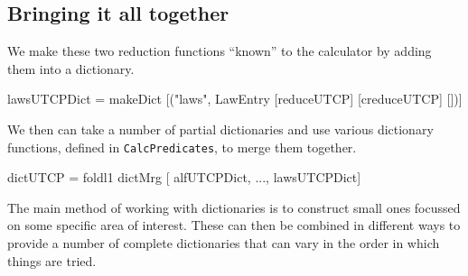 %
%


\subsection{Bringing it all together}

We make these two reduction functions ``known'' to the calculator
by adding them into a dictionary.
\begin{code}
lawsUTCPDict
 = makeDict [("laws", LawEntry [reduceUTCP] [creduceUTCP] [])]
\end{code}
We then can take a number of partial dictionaries and use various
dictionary functions,
defined in \texttt{CalcPredicates}, to merge them together.
\begin{code}
dictUTCP = foldl1 dictMrg [ alfUTCPDict, ..., lawsUTCPDict]
\end{code}
The main method of working with dictionaries 
is to construct small ones
focussed on some specific area of interest.
These can then be combined in different ways to provide a number of complete
dictionaries that can vary in the order in which things are tried.









